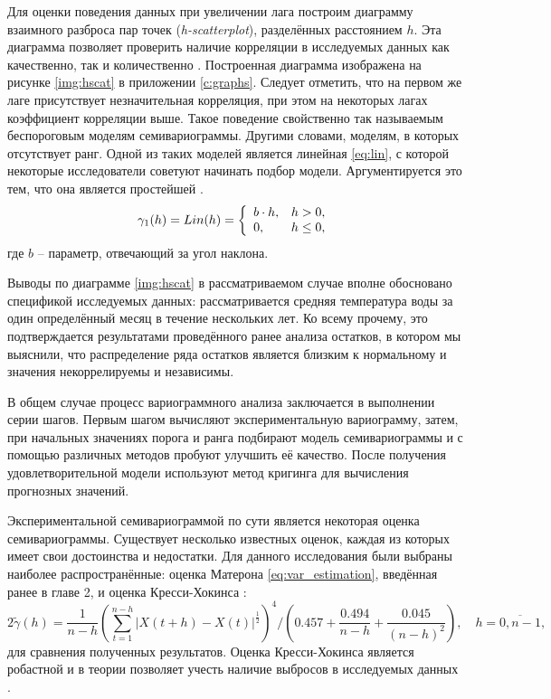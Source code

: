 Для оценки поведения данных при увеличении лага построим диаграмму взаимного разброса пар точек (\textit{h-scatterplot}), разделённых расстоянием $ h $. Эта диаграмма позволяет проверить наличие корреляции в исследуемых данных как качественно, так и количественно \cite{saveliev2012}. Построенная диаграмма изображена на рисунке \ref{img:hscat} в приложении \ref{c:graphs}. Следует отметить, что на первом же лаге присутствует незначительная корреляция, при этом на некоторых лагах коэффициент корреляции выше. Такое поведение свойственно так называемым беспороговым моделям семивариограммы. Другими словами, моделям, в которых отсутствует ранг. Одной из таких моделей является линейная \eqref{eq:lin}, с которой некоторые исследователи советуют начинать подбор модели. Аргументируется это тем, что она является простейшей \cite{saveliev2012}.
\begin{equation}
\label{eq:lin}
	\gamma_1(h) = Lin(h) = \left\{
 \begin{array}{l l}
   b \cdot h, & h > 0, \\
   0, & h \leq 0,
 \end{array} \right.
\end{equation}
где $ b $ -- параметр, отвечающий за угол наклона.

Выводы по диаграмме \ref{img:hscat} в рассматриваемом случае вполне обосновано спецификой исследуемых данных: рассматривается средняя температура воды за один определённый месяц в течение нескольких лет. Ко всему прочему, это подтверждается результатами проведённого ранее анализа остатков, в котором мы выяснили, что распределение ряда остатков является близким к нормальному и значения некоррелируемы и независимы.

В общем случае процесс вариограммного анализа заключается в выполнении серии шагов. Первым шагом вычисляют экспериментальную вариограмму, затем, при начальных значениях порога и ранга подбирают модель семивариограммы и с помощью различных методов пробуют улучшить её качество. После получения удовлетворительной модели используют метод кригинга для вычисления прогнозных значений.

Экспериментальной семивариограммой по сути является некоторая оценка семивариограммы. Существует несколько известных оценок, каждая из которых имеет свои достоинства и недостатки. Для данного исследования были выбраны наиболее распространённые: оценка Матерона \eqref{eq:var_estimation}, введённая ранее в главе 2, и оценка Кресси-Хокинса \cite{cressie1993statistics, dutter}:
\begin{equation*}
	2 \tilde{\gamma}(h) = \frac{1}{n - h} (\sum_{t = 1}^{n - h} | X(t + h) - X(t) |^{\frac{1}{2}} )^4 / (0.457 + \frac{0.494}{n - h} + \frac{0.045}{(n - h)^2}), \quad h = \overline{0, n - 1},
\end{equation*}
для сравнения полученных результатов. Оценка Кресси-Хокинса является робастной и в теории позволяет учесть наличие выбросов в исследуемых данных \cite{MINGOTI2008}.

